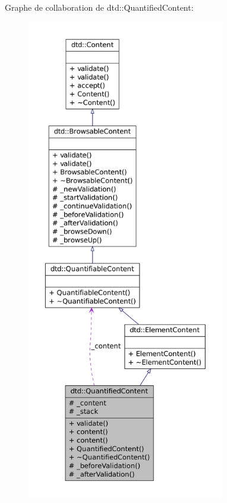 Graphe de collaboration de dtd::QuantifiedContent:\nopagebreak
\begin{figure}[H]
\begin{center}
\leavevmode
\includegraphics[height=600pt]{classdtd_1_1_quantified_content__coll__graph}
\end{center}
\end{figure}
